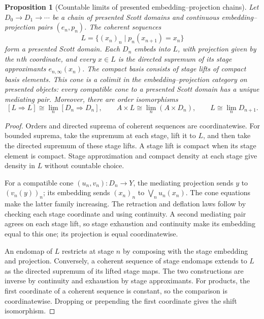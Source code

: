 \documentclass[11pt,a4paper]{article}
\newtheorem{proposition}[theorem]{Proposition}
\theoremstyle{definition}
\theoremstyle{remark}
\newcommand{\Cont}[2]{[#1\mathbin{\Rightarrow}#2]}
\newcommand{\lub}{\bigvee}
\begin{document}
\begin{proposition}[Countable limits of presented embedding--projection chains]
Let $D_0\to D_1\to\cdots$ be a chain of presented Scott domains and
continuous embedding--projection pairs $(e_n,p_n)$. The coherent sequences
\[
 L=\{(x_n)_n\mid p_n(x_{n+1})=x_n\}
\]
form a presented Scott domain. Each $D_n$ embeds into $L$, with projection
given by the $n$th coordinate, and every $x\in L$ is the directed supremum
of its stage approximants $e_{n,\infty}(x_n)$. The compact basis consists of
stage lifts of compact basis elements. This cone is a colimit in the
embedding--projection category on presented objects: every compatible
cone to a presented Scott domain has a unique mediating pair. Moreover,
there are order
isomorphisms
\[
 \Cont{L}{L}\cong\lim_n\Cont{D_n}{D_n},
 \qquad A\times L\cong\lim_n(A\times D_n),
 \qquad L\cong\lim_n D_{n+1}.
\]
\end{proposition}
\begin{proof}
Orders and directed suprema of coherent sequences are coordinatewise.
For bounded suprema, take the supremum at each stage, lift it to $L$,
and then take the directed supremum of these stage lifts. A stage lift is
compact when its stage element is compact. Stage approximation and compact
density at each stage give density in $L$ without countable choice.

For a compatible cone $(u_n,v_n):D_n\to Y$, the mediating projection sends
$y$ to $(v_n(y))_n$; its embedding sends $(x_n)_n$ to
$\lub_n u_n(x_n)$. The cone equations make the latter family increasing.
The retraction and deflation laws follow by checking each stage coordinate
and using continuity. A second mediating pair agrees on each stage lift,
so stage exhaustion and continuity make its embedding equal to this one;
its projection is equal coordinatewise.

An endomap of $L$ restricts at stage $n$ by composing with the stage
embedding and projection. Conversely, a coherent sequence of stage
endomaps extends to $L$ as the directed supremum of its lifted stage maps.
The two constructions are inverse by continuity and exhaustion by stage
approximants. For products, the first coordinate of a coherent sequence is
constant, so the comparison is coordinatewise. Dropping or prepending the
first coordinate gives the shift isomorphism.
\end{proof}
\end{document}
